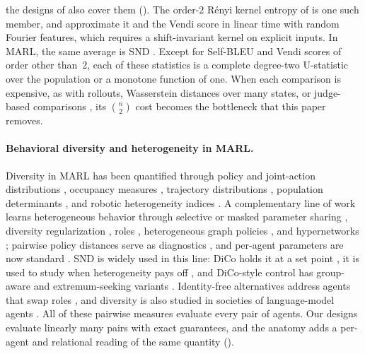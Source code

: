 the designs of  also cover them (). The order-$2$ R\'enyi kernel
entropy of \citet{jalali2023information} is one such member, and
\citet{ospanov2024scalable} approximate it and the Vendi score in linear time
with random Fourier features, which requires a shift-invariant kernel on
explicit inputs. In MARL, the same average is SND \citep{bettini2025snd}. Except for Self-BLEU and Vendi scores of order other than~$2$, each of these
statistics is a complete degree-two U-statistic over the population or a
monotone function of one. When each comparison
is expensive, as with rollouts, Wasserstein distances over many states, or
judge-based comparisons \citep{zheng2023judging}, its $\binom{n}{2}$ cost becomes the bottleneck that
this paper removes.

\paragraph{Behavioral diversity and heterogeneity in MARL.}
Diversity in MARL has been quantified through policy and joint-action
distributions \citep{yu2021informative,mckee2022diversity,hu2022policy},
occupancy measures \citep{liu2021unifying}, trajectory distributions
\citep{lupu2021trajedi}, population determinants
\citep{parker-holder2020effective}, and robotic heterogeneity indices
\citep{balch2000hse,twu2014measure,prorok2017impact}. A complementary line of
work learns heterogeneous behavior through selective or masked parameter
sharing \citep{christianos2021scaling,li2024kaleidoscope}, diversity
regularization \citep{li2021celebrating}, roles
\citep{wang2020roma,wang2021rode}, heterogeneous graph policies
\citep{bettini2023hetgppo}, and hypernetworks \citep{tessera2024hypermarl};
pairwise policy distances serve as diagnostics \citep{hu2024measuring}, and
per-agent parameters are now standard \citep{zhong2024heterogeneous}. SND is
widely used in this line: DiCo holds it at a set point
\citep{bettini2024dico}, it is used to study when heterogeneity pays off
\citep{bettini2024impact,amir2025diversity}, and DiCo-style control has
group-aware and extremum-seeking variants
\citep{yang2025structured,patel2026optimizing}. Identity-free alternatives
address agents that swap roles \citep{buchi2026events}, and diversity is
also studied in societies of language-model agents \citep{huot2026routing}.
All of these pairwise measures evaluate every pair of agents. Our designs
evaluate linearly many pairs with exact guarantees, and the anatomy adds a
per-agent and relational reading of the same quantity
().

